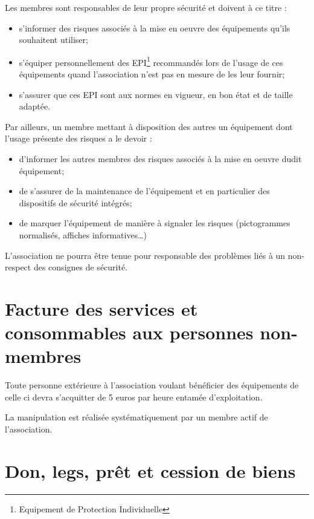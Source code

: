 \documentclass[a4paper, 11pt]{article}
\begin{document}
Les membres sont responsables de leur propre sécurité et doivent à ce titre :

\begin{itemize}
    \item s'informer des risques associés à la mise en oeuvre des équipements qu'ils souhaitent utiliser;
    \item s'équiper personnellement des EPI\footnote{Equipement de Protection Individuelle} recommandés lors de l'usage
        de ces équipements quand l'association n'est pas en mesure de les leur fournir;
    \item s'assurer que ces EPI sont aux normes en vigueur, en bon état et de taille adaptée.
\end{itemize}

Par ailleurs, un membre mettant à disposition des autres un équipement dont l'usage présente des risques a le devoir :

\begin{itemize}
    \item d'informer les autres membres des risques associés à la mise en oeuvre dudit équipement;
    \item de s'assurer de la maintenance de l'équipement et en particulier des dispositifs de sécurité intégrés;
    \item de marquer l'équipement de manière à signaler les risques (pictogrammes normalisés, affiches
        informatives\ldots)
\end{itemize}

L'association ne pourra être tenue pour responsable des problèmes liés à un non-respect des consignes de sécurité.


\section{Facture des services et consommables aux personnes non-membres} %

Toute personne extérieure à l'association voulant bénéficier des
équipements de celle ci devra s'acquitter de 5 euros par heure entamée
d'exploitation.


La manipulation est réalisée systématiquement par un membre actif de
l'association.


\section{Don, legs, prêt et cession de biens} %
\end{document}
